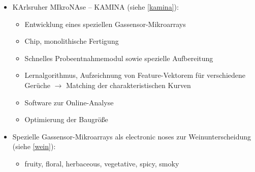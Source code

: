 \begin{itemize}
\item KArlsruher MIkroNAse -- KAMINA (siehe \autoref{kamina}): 
\begin{itemize}
\item Entwicklung eines speziellen Gassensor-Mikroarrays
\item Chip, monolithische Fertigung
\item Schnelles Probeentnahmemodul sowie spezielle Aufbereitung
\item Lernalgorithmus, Aufzeichnung von Feature-Vektorem für verschiedene Gerüche $\rightarrow$ Matching der charakteristischen Kurven
\item Software zur Online-Analyse
\item Optimierung der Baugröße
\end{itemize}
\item Spezielle Gassensor-Mikroarrays als \glqq electronic noses\grqq{} zur Weinunterscheidung \\(siehe \autoref{wein}):
\begin{itemize}
\item fruity, floral, herbaceous, vegetative, spicy, smoky
\end{itemize}
\end{itemize}
